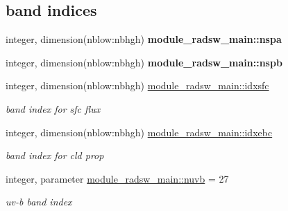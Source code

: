 \subsection*{band indices}
\begin{DoxyCompactItemize}
\item 
\mbox{\label{group__module__radsw__main_ga4c0fc140a51c619089128f52e4bb878c}} 
integer, dimension(nblow\+:nbhgh) {\bfseries module\+\_\+radsw\+\_\+main\+::nspa}
\item 
\mbox{\label{group__module__radsw__main_ga6be022a4a1ae32248d9721a9fff93db6}} 
integer, dimension(nblow\+:nbhgh) {\bfseries module\+\_\+radsw\+\_\+main\+::nspb}
\item 
\mbox{\label{group__module__radsw__main_gad295d723dd7d269cb51c73923a4cbb94}} 
integer, dimension(nblow\+:nbhgh) \hyperlink{group__module__radsw__main_gad295d723dd7d269cb51c73923a4cbb94}{module\+\_\+radsw\+\_\+main\+::idxsfc}
\begin{DoxyCompactList}\small\item\em band index for sfc flux \end{DoxyCompactList}\item 
\mbox{\label{group__module__radsw__main_gaa20102786f7e7f8c71fb2783082eac1b}} 
integer, dimension(nblow\+:nbhgh) \hyperlink{group__module__radsw__main_gaa20102786f7e7f8c71fb2783082eac1b}{module\+\_\+radsw\+\_\+main\+::idxebc}
\begin{DoxyCompactList}\small\item\em band index for cld prop \end{DoxyCompactList}\item 
\mbox{\label{group__module__radsw__main_ga177282b3087dce2f54f1233ee8631231}} 
integer, parameter \hyperlink{group__module__radsw__main_ga177282b3087dce2f54f1233ee8631231}{module\+\_\+radsw\+\_\+main\+::nuvb} = 27
\begin{DoxyCompactList}\small\item\em uv-\/b band index \end{DoxyCompactList}\end{DoxyCompactItemize}
